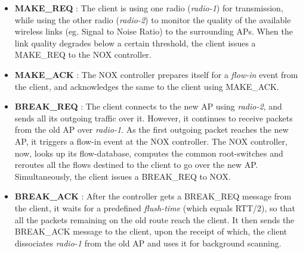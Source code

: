 \begin{itemize}

\item
{\bf MAKE\_REQ} : The client is using one radio (\emph{radio-1}) for transmission, while using 
the other radio (\emph{radio-2}) to monitor the quality of the available wireless links (eg. Signal to Noise Ratio) 
to the surrounding APs. When the link quality degrades below a certain threshold, 
the client issues a MAKE\_REQ to the NOX controller.

\item
{\bf MAKE\_ACK} : The NOX controller prepares itself for a \emph{flow-in} event from the client,
and acknowledges the same to the client using MAKE\_ACK.

\item
{\bf BREAK\_REQ} : The client connects to the new AP using \emph{radio-2}, and 
sends all its outgoing traffic over it. However, it continues to receive packets from the old AP
over \emph{radio-1}. As the first outgoing packet reaches the new AP, it triggers a flow-in event
at the NOX controller. The NOX controller, now, looks up its flow-database, computes the common root-switches
 and reroutes all the 
flows destined to the client to go over the new AP. Simultaneously, the client issues a BREAK\_REQ to NOX.

\item
{\bf BREAK\_ACK} : After the controller gets a BREAK\_REQ message from the client, it waits for a predefined
\emph{flush-time} (which equals RTT/$2$), so that all the packets remaining on the old route reach the client.
It then sends the BREAK\_ACK message to the client, upon the receipt of which, the client dissociates \emph{radio-1} from
the old AP and uses it for background scanning.

\end{itemize}

